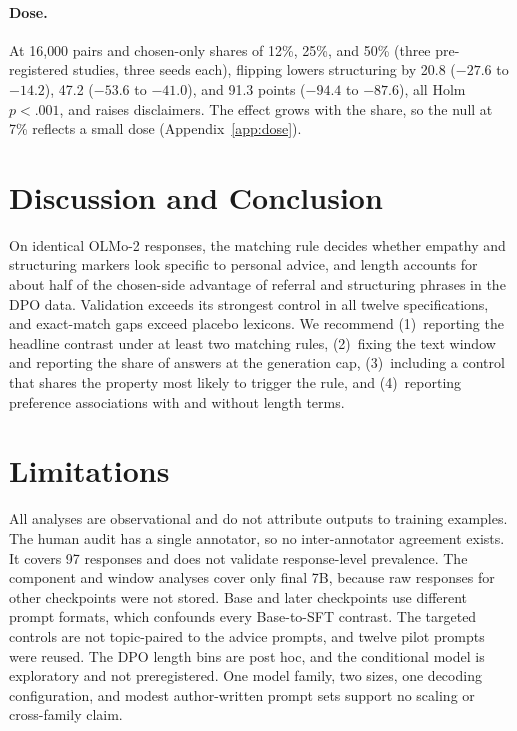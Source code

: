 \documentclass[11pt]{article}
\newif\ifpivot
\begin{document}
\paragraph{Dose.}
At 16{,}000 pairs and chosen-only shares of 12\%, 25\%, and 50\% (three
pre-registered studies, three seeds each), flipping
lowers structuring by 20.8 ($-27.6$ to $-14.2$), 47.2 ($-53.6$ to $-41.0$),
and 91.3 points ($-94.4$ to $-87.6$), all Holm $p<.001$, and raises
disclaimers. The effect grows with the share, so the null at 7\% reflects
a small dose (Appendix~\ref{app:dose}).

\fi

\section{Discussion and Conclusion}
\label{sec:roadmap}
On identical OLMo-2 responses, the matching rule decides whether empathy
and structuring markers look specific to personal advice, and length
accounts for about half of the chosen-side advantage of referral and
structuring phrases in the DPO data. Validation exceeds its strongest
control in all twelve specifications, and exact-match gaps exceed placebo
lexicons.\ifpivot{} Flipping the pairs that carry these phrases lowers structuring in
proportion to their share of training.\fi{} We recommend (1)~reporting the headline
contrast under at least two matching rules, (2)~fixing the text window and
reporting the share of answers at the generation cap, (3)~including a
control that shares the property most likely to trigger the rule, and
(4)~reporting preference associations with and without length terms.

\section{Limitations}
\label{sec:limitations}

\ifpivot
The counterfactual models are retrained at 1B with a smaller batch and data
sample than the released recipe, so they test the preference data at this
setting and are not the released DPO model. RQ1 to RQ3 remain observational.
\else
All analyses are observational and do not attribute outputs to training
examples.
\fi The human audit has a single annotator, so no inter-annotator agreement
exists. It covers 97 responses and does not validate response-level
prevalence. The component and window analyses cover only
final 7B, because raw responses for other checkpoints were not stored. Base
and later checkpoints use different prompt formats, which confounds every
Base-to-SFT contrast. The targeted controls are not topic-paired to the
advice prompts, and twelve pilot prompts were reused. The DPO length bins are
post hoc, and the conditional model is exploratory and not preregistered.
One model family, two sizes, one decoding configuration, and modest
author-written prompt sets support no scaling or cross-family claim.
\end{document}
